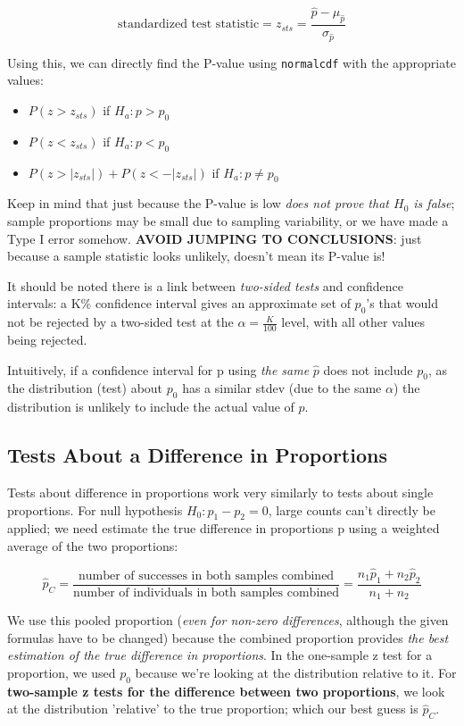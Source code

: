 \documentclass[12pt, a4paper]{article}
\theoremstyle{definition}
\begin{document}
\[\textrm{standardized test statistic} = z_{sts} = \frac{\hat{p} - \mu_{\hat{p}}}{\sigma_{\hat{p}}}\]

Using this, we can directly find the P-value using \verb|normalcdf| with the appropriate values:
\begin{itemize}
    \item $P(z > z_{sts})$ if $H_a : p > p_0$
    \item $P(z < z_{sts})$ if $H_a : p < p_0$
    \item $P(z > |z_{sts}|) + P(z < -|z_{sts}|)$ if $H_a : p \neq p_0$
\end{itemize}

Keep in mind that just because the P-value is low \textit{does not prove that $H_0$ is false}; sample proportions may be small due to sampling variability, or we have made a Type I error somehow. \textbf{AVOID JUMPING TO CONCLUSIONS}: just because a sample statistic looks unlikely, doesn't mean its P-value is!

It should be noted there is a link between \textit{two-sided tests} and confidence intervals: a K\% confidence interval gives an approximate set of $p_0$'s that would not be rejected by a two-sided test at the $\alpha = \frac{K}{100}$ level, with all other values being rejected.

Intuitively, if a confidence interval for p using \textit{the same} $\hat{p}$ does not include $p_0$, as the distribution (test) about $p_0$ has a similar stdev (due to the same $\alpha$) the distribution is unlikely to include the actual value of $p$.

\subsection{Tests About a Difference in Proportions}
Tests about difference in proportions work very similarly to tests about single proportions. For null hypothesis $H_0 : p_1 - p_2 = 0$, large counts can't directly be applied; we need estimate the true difference in proportions p using a weighted average of the two proportions:

\[\hat{p}_C = \frac{\textrm{number of successes in both samples combined}}{\textrm{number of individuals in both samples combined}} = \frac{n_1 \hat{p}_1 + n_2 \hat{p}_2}{n_1 + n_2}\]

We use this pooled proportion (\textit{even for non-zero differences}, although the given formulas have to be changed) because the combined proportion provides \textit{the best estimation of the true difference in proportions}.
In the one-sample z test for a proportion, we used $p_0$ because we're looking at the distribution relative to it.
For \textbf{two-sample z tests for the difference between two proportions}, we look at the distribution 'relative' to the true proportion; which our best guess is $\hat{p}_C$.
\end{document}
